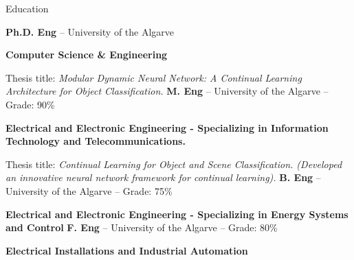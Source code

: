 \begin{rubric}{Education}


  \entry*[\texttt{2021 –- ...~~~~~~~~}]
  \textbf{Ph.D. Eng} -- University of the Algarve

  \vspace{0.1cm}
  \par \textbf{Computer Science \& Engineering}

  \par Thesis title: \emph{ Modular Dynamic Neural Network: A Continual Learning Architecture for Object
    Classification.}
  \vspace{0.15cm}
  \entry*[\texttt{2018 -- 2020~~~~~~~}]
  \textbf{M. Eng} -- University of the Algarve -- Grade: 90\%

  \vspace{0.1cm}
  \par \textbf{Electrical and Electronic Engineering - Specializing in Information Technology and
    Telecommunications.}

  \par Thesis title: \emph{ Continual Learning for Object and Scene Classification. (Developed an innovative
    neural network framework for continual learning).}
  \vspace{0.15cm}
  \entry*[\texttt{2015 -- 2018~~~~~~~}]
  \textbf{B. Eng} -- University of the Algarve -- Grade: 75\%

  \vspace{0.1cm}
  \par \textbf{Electrical and Electronic Engineering - Specializing in Energy Systems and Control}
  \vspace{0.15cm}
  \entry*[\texttt{2013 -- 2015~~~~~~~}]
  \textbf{F. Eng} -- University of the Algarve -- Grade: 80\%

  \vspace{0.1cm}
  \par \textbf{Electrical Installations and Industrial Automation}
  \vspace{0.15cm}

\end{rubric}